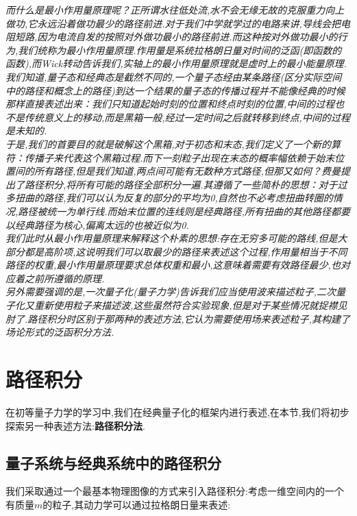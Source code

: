     \textit{而什么是最小作用量原理呢？正所谓水往低处流,水不会无缘无故的克服重力向上做功,它永远沿着做功最少的路径前进.对于我们中学就学过的电路来讲,导线会把电阻短路,因为电流自发的按照对外做功最小的路径前进.而这种按对外做功最小的行为,我们统称为最小作用量原理.作用量是系统拉格朗日量对时间的泛函(即函数的函数),而Wick转动告诉我们,实轴上的最小作用量原理就是虚时上的最小能量原理.\\
    我们知道,量子态和经典态是截然不同的,一个量子态经由某条路径(区分实际空间中的路径和概念上的路径)到达一个结果的量子态的传播过程并不能像经典的时候那样直接表述出来：我们只知道起始时刻的位置和终点时刻的位置,中间的过程也不是传统意义上的移动,而是黑箱一般,经过一定时间之后就转移到终点,中间的过程是未知的.\\
    于是,我们的首要目的就是破解这个黑箱,对于初态和末态,我们定义了一个新的算符：传播子来代表这个黑箱过程.而下一刻粒子出现在末态的概率幅依赖于始末位置间的所有路径,但是我们知道,两点间可能有无数种方式路径,但那又如何？费曼提出了路径积分,将所有可能的路径全部积分一遍.其遵循了一些简朴的思想：对于过多扭曲的路径,我们可以认为反复的部分的平均为0,自然也不必考虑扭曲转圈的情况,路径被统一为单行线.而始末位置的连线则是经典路径,所有扭曲的其他路径都要以经典路径为核心,偏离太远的也被近似为0.\\
    我们此时从最小作用量原理来解释这个朴素的思想:存在无穷多可能的路线,但是大部分都是高阶项,这说明我们可以取最少的路径来表述这个过程,作用量相当于不同路径的权重,最小作用量原理要求总体权重和最小,这意味着需要有效路径最少,也对应着之前所遵循的原理.\\
    另外需要强调的是,一次量子化(量子力学)告诉我们应当使用波来描述粒子,二次量子化又重新使用粒子来描述波,这些虽然符合实验现象,但是对于某些情况就捉襟见肘了.路径积分时区别于那两种的表述方法,它认为需要使用场来表述粒子,其构建了场论形式的泛函积分方法.}
\section{路径积分}
在初等量子力学的学习中,我们在经典量子化的框架内进行表述,在本节,我们将初步探索另一种表述方法:\textbf{路径积分法}.
\subsection{量子系统与经典系统中的路径积分}
我们采取通过一个最基本物理图像的方式来引入路径积分:考虑一维空间内的一个有质量$ m $的粒子,其动力学可以通过拉格朗日量来表述:\\

